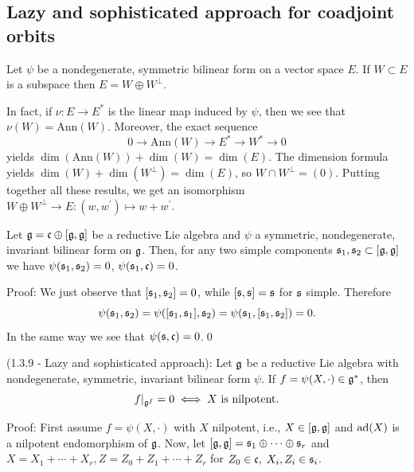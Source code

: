 \subsection{Lazy and sophisticated approach for coadjoint orbits}
\begin{dang}
    \begin{remark}
        Let $\psi$ be a nondegenerate, symmetric bilinear form on a vector space $E$. If $W\subset E$ is a subspace 
        then $E=W\oplus W^\perp$.\par
        In fact, if $\nu:E\to E^*$ is the linear map induced by $\psi$, then we see that $\nu(W)=\text{Ann}(W)$. Moreover,
        the exact sequence 
        \begin{equation}
            0\to \text{Ann}(W)\to E^*\to W^*\to0
        \end{equation}
        yields $\dim(\text{Ann}(W))+\dim(W)=\dim(E)$. The dimension formula yields $\dim(W)+\dim(W^\perp)=\dim(E)$, so 
        $W\cap W^\perp=(0)$. Putting together all these results, we get an isomorphism 
        $W\oplus W^\perp\to E:(w,w^\prime)\mapsto w+w^\prime$.
    \end{remark}
\end{dang}

\begin{dang}
    \begin{lemma}
        Let $\mathfrak{g}=\mathfrak{c}\oplus [\mathfrak{g},\mathfrak{g}]$ be a reductive Lie algebra and 
        $\psi$ a symmetric, nondegenerate, invariant bilinear form on $\mathfrak{g}$. 
        Then, for any two simple components $\mathfrak{s}_1,\mathfrak{s}_2\subset[\mathfrak{g},\mathfrak{g}]$ we have 
        $\psi(\mathfrak{s}_1,\mathfrak{s}_2)=0$, $\psi(\mathfrak{s}_1,\mathfrak{c})=0$.
    \end{lemma}
\end{dang}
Proof: We just observe that $[\mathfrak{s}_1,\mathfrak{s}_2]=0$, while $[\mathfrak{s},\mathfrak{s}]=\mathfrak{s}$ for $\mathfrak{s}$ simple. Therefore 
\begin{equation}
    \psi(\mathfrak{s}_1,\mathfrak{s}_2)=\psi([\mathfrak{s}_1,\mathfrak{s}_1],\mathfrak{s}_2)=\psi(\mathfrak{s}_1,[\mathfrak{s}_1,\mathfrak{s}_2])=0.
\end{equation}
In the same way we see that $\psi(\mathfrak{s},\mathfrak{c})=0$.\qed

\begin{dang}
    \begin{lemma}\label{Lemma: lazy vs sophisticated approach to nilpotent orbits}
        (1.3.9 - Lazy and sophisticated approach):
        Let $\mathfrak{g}$ be a reductive Lie algebra with nondegenerate, symmetric, invariant bilinear form $\psi$. 
        If $f=\psi(X,\cdot)\in\mathfrak{g}^*$, then 
        \begin{equation}
            f|_{\mathfrak{g}^f}=0\iff X\text{ is nilpotent}.
        \end{equation}
    \end{lemma}
\end{dang}
Proof: First assume $f=\psi(X,\cdot)$ with $X$ nilpotent, i.e., $X\in[\mathfrak{g},\mathfrak{g}]$ and $\text{ad}(X)$ is a nilpotent
endomorphism of $\mathfrak{g}$. Now, let $[\mathfrak{g},\mathfrak{g}]=\mathfrak{s}_1\oplus\cdots\oplus\mathfrak{s}_r$ and 
$X=X_1+\cdots+X_r, Z=Z_0+Z_1+\cdots+Z_r$ for $Z_0\in\mathfrak{c},\;X_i,Z_i\in\mathfrak{s}_i$. 


